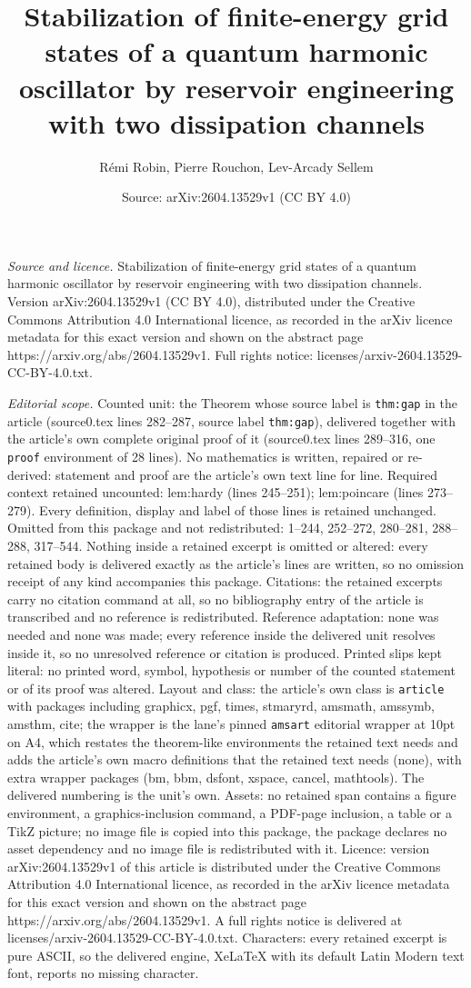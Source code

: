 \documentclass[10pt,a4paper]{amsart}
\title[Stabilization of finite-energy grid states of a quantum harm]{Stabilization of finite-energy grid states of a quantum harmonic oscillator by reservoir engineering with two dissipation channels}
\author{R\'emi Robin, Pierre Rouchon, Lev-Arcady Sellem}
\date{Source: arXiv:2604.13529v1 (CC BY 4.0)}
\begin{document}
\maketitle

\noindent\emph{Source and licence.} Stabilization of finite-energy grid states of a quantum harmonic oscillator by reservoir engineering with two dissipation channels. Version arXiv:2604.13529v1 (CC BY 4.0), distributed under the Creative Commons Attribution 4.0 International licence, as recorded in the arXiv licence metadata for this exact version and shown on the abstract page https://arxiv.org/abs/2604.13529v1. Full rights notice: licenses/arxiv-2604.13529-CC-BY-4.0.txt.\par\smallskip

\noindent\textit{Editorial scope.} Counted unit: the Theorem whose source label is \texttt{thm:gap} in the article (source0.tex lines 282--287, source label \texttt{thm:gap}), delivered together with the article's own complete original proof of it (source0.tex lines 289--316, one \texttt{proof} environment of 28 lines). No mathematics is written, repaired or re-derived: statement and proof are the article's own text line for line. Required context retained uncounted: lem:hardy (lines 245--251); lem:poincare (lines 273--279). Every definition, display and label of those lines is retained unchanged. Omitted from this package and not redistributed: 1--244, 252--272, 280--281, 288--288, 317--544. Nothing inside a retained excerpt is omitted or altered: every retained body is delivered exactly as the article's lines are written, so no omission receipt of any kind accompanies this package. Citations: the retained excerpts carry no citation command at all, so no bibliography entry of the article is transcribed and no reference is redistributed. Reference adaptation: none was needed and none was made; every reference inside the delivered unit resolves inside it, so no unresolved reference or citation is produced. Printed slips kept literal: no printed word, symbol, hypothesis or number of the counted statement or of its proof was altered. Layout and class: the article's own class is \texttt{article} with packages including graphicx, pgf, times, stmaryrd, amsmath, amssymb, amsthm, cite; the wrapper is the lane's pinned \texttt{amsart} editorial wrapper at 10pt on A4, which restates the theorem-like environments the retained text needs and adds the article's own macro definitions that the retained text needs (none), with extra wrapper packages (bm, bbm, dsfont, xspace, cancel, mathtools). The delivered numbering is the unit's own. Assets: no retained span contains a figure environment, a graphics-inclusion command, a PDF-page inclusion, a table or a TikZ picture; no image file is copied into this package, the package declares no asset dependency and no image file is redistributed with it. Licence: version arXiv:2604.13529v1 of this article is distributed under the Creative Commons Attribution 4.0 International licence, as recorded in the arXiv licence metadata for this exact version and shown on the abstract page https://arxiv.org/abs/2604.13529v1. A full rights notice is delivered at licenses/arxiv-2604.13529-CC-BY-4.0.txt. Characters: every retained excerpt is pure ASCII, so the delivered engine, XeLaTeX with its default Latin Modern text font, reports no missing character.
\end{document}
